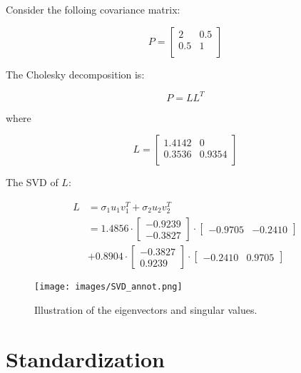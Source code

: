 \documentclass{article}
\begin{document}
Consider the folloing covariance matrix:

\begin{equation}
    P = \begin{bmatrix}
    2 & 0.5 \\
    0.5 & 1 \\
    \end{bmatrix}
\end{equation}

The Cholesky decomposition is:

\begin{equation}
    P = L L^T
\end{equation}

where

\begin{equation}
    L = \begin{bmatrix}
    1.4142 & 0 \\
    0.3536 & 0.9354 \\
    \end{bmatrix}
\end{equation}

The SVD of $L$:

\begin{equation}
\begin{split}
    L &= \sigma_1 u_1 v_1^T + \sigma_2 u_2 v_2^T \\
    &= 1.4856 \cdot \begin{bmatrix} -0.9239 \\ -0.3827 \end{bmatrix} \cdot \begin{bmatrix} -0.9705 & -0.2410 \end{bmatrix} \\
    &+ 0.8904 \cdot \begin{bmatrix} -0.3827 \\ 0.9239 \end{bmatrix} \cdot \begin{bmatrix} -0.2410 & 0.9705 \end{bmatrix}
\end{split}
\end{equation}

\begin{figure}[ht]
 \centering
  \texttt{[image: images/SVD\_annot.png]}
 \caption{Illustration of the eigenvectors and singular values.}
\end{figure}

\section{Standardization}
\end{document}
